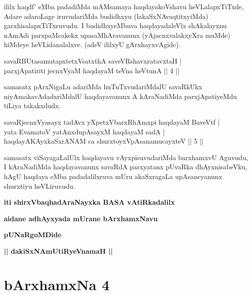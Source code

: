 \begin{artha}
ililx haqdf' eMba padadiMda mAMsamaya haqdayakoVshavu heVLalapxTiTxde, Adare adaroLage iruvudariMda budidhxyu (lakaSxNAvaqtitxyiMda) garxhisalapxTiTxruvudu. I budidhxyeMbuva haqdayadaleVlx shAkalayxnu nAmAdi parxpaMcakekx upasaMhAravanunx (yAjacnxvalakxyXra muMde) hiMdeye heVLidanalalxve. (adeV ililxyU gArxhayxvAgide).
\end{artha}


\begin{shl}
savaRBUtasamutapxtetxVsatxthA saveVRshavxratavxtaH | \\
parxjApatiriti jecnxVyaM haqdayaM teVna heVtunA \hfill ||  4 || 
\end{shl}

\begin{artha}
samasatx pArxNigaLu adariMda huTuTxvudariMdalU savaRkUkx niyAmakavAdadxriMdalU haqdayavanunx A kAraNadiMda parxjApatiyeMdu tiLiya takakxdudx.
\end{artha}


\begin{shl}
savaRjecnxVyasayx tadAvx	yXpetxVbarxRhAmxpi haqdayaM BaveVtf | \\
yata EvamatoV yatAnxdupAsayxM haqdayaM sadA  | \\
 haqdayAKAyxkaSxrANAM ca shurxtoyxVpAsanamucayxteV \hfill ||  5 ||
\end{shl}

\begin{artha}
samasatx viSayagaLalUlx haqdayavu vAyxpisuvudariMda barxhamxvU Aguvudu, I kAraNadiMda haqdayavanunx savaRdA parxyatanx pUvaRka dhAyxnisabeVku, hAgU haqdaya eMba padadalilxruva mUru akaSxragaLa upAsaneyanunx shurxtiyu heVLiruvudu.
\end{artha}

\begin{center}
{\bf iti shirxVbaqhadAraNayxka BASA vAtiRkadalilx}
\medskip

{\bf aidane adhAyxyada mUrane bArxhamxNavu}

\smallskip
{\bf pUNaRgoMDide}

\smallskip
{\bf || dakiSxNAmUtiRyeVnamaH ||}
\end{center}

\bigskip

\section*{bArxhamxNa 4}

